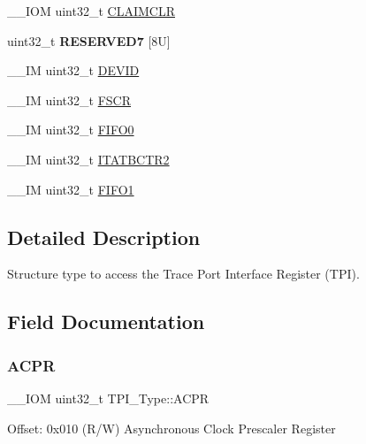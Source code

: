 \begin{DoxyCompactItemize}
\item 
\+\_\+\+\_\+\+I\+OM uint32\+\_\+t \hyperlink{struct_t_p_i___type_a0e10e292cb019a832b03ddd055b2f6ac}{C\+L\+A\+I\+M\+C\+LR}
\item 
\mbox{\label{struct_t_p_i___type_a33bb14730a444fdeeb91ea9cb7218e62}} 
uint32\+\_\+t {\bfseries R\+E\+S\+E\+R\+V\+E\+D7} \mbox{[}8\+U\mbox{]}
\item 
\+\_\+\+\_\+\+IM uint32\+\_\+t \hyperlink{struct_t_p_i___type_abc0ecda8a5446bc754080276bad77514}{D\+E\+V\+ID}
\item 
\+\_\+\+\_\+\+IM uint32\+\_\+t \hyperlink{struct_t_p_i___type_ad6901bfd8a0089ca7e8a20475cf494a8}{F\+S\+CR}
\item 
\+\_\+\+\_\+\+IM uint32\+\_\+t \hyperlink{struct_t_p_i___type_aa4d7b5cf39dff9f53bf7f69bc287a814}{F\+I\+F\+O0}
\item 
\+\_\+\+\_\+\+IM uint32\+\_\+t \hyperlink{struct_t_p_i___type_ab358319b969d3fed0f89bbe33e9f1652}{I\+T\+A\+T\+B\+C\+T\+R2}
\item 
\+\_\+\+\_\+\+IM uint32\+\_\+t \hyperlink{struct_t_p_i___type_a061372fcd72f1eea871e2d9c1be849bc}{F\+I\+F\+O1}
\end{DoxyCompactItemize}


\subsection{Detailed Description}
Structure type to access the Trace Port Interface Register (T\+PI). 

\subsection{Field Documentation}
\mbox{\label{struct_t_p_i___type_a9e5e4421ef9c3d5b7ff8b24abd4e99b3}} 
\subsubsection{\texorpdfstring{A\+C\+PR}{ACPR}}
{\footnotesize\ttfamily \+\_\+\+\_\+\+I\+OM uint32\+\_\+t T\+P\+I\+\_\+\+Type\+::\+A\+C\+PR}

Offset\+: 0x010 (R/W) Asynchronous Clock Prescaler Register \mbox{\label{struct_t_p_i___type_a0e10e292cb019a832b03ddd055b2f6ac}} 
